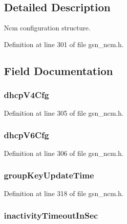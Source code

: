 \subsection{Detailed Description}
Ncm configuration structure. 

Definition at line 301 of file gsn\_\-ncm.h.



\subsection{Field Documentation}
\hypertarget{a00157_ab0f8d1af7d88f225c55294a8f821fd67}{
\subsubsection[{dhcpV4Cfg}]{ {\bf dhcpV4Cfg}}}
\label{a00157_ab0f8d1af7d88f225c55294a8f821fd67}


Definition at line 305 of file gsn\_\-ncm.h.

\hypertarget{a00157_a2d37f74ea39d1eb3096a12da8975ee58}{
\subsubsection[{dhcpV6Cfg}]{ {\bf dhcpV6Cfg}}}
\label{a00157_a2d37f74ea39d1eb3096a12da8975ee58}


Definition at line 306 of file gsn\_\-ncm.h.

\hypertarget{a00157_adc9045c1c06adcde56a323e42f827f57}{
\subsubsection[{groupKeyUpdateTime}]{ {\bf groupKeyUpdateTime}}}
\label{a00157_adc9045c1c06adcde56a323e42f827f57}


Definition at line 318 of file gsn\_\-ncm.h.

\hypertarget{a00157_a6f21209eb61935400e9b58ac8c43913c}{
\subsubsection[{inactivityTimeoutInSec}]{ {\bf inactivityTimeoutInSec}}}
\label{a00157_a6f21209eb61935400e9b58ac8c43913c}


